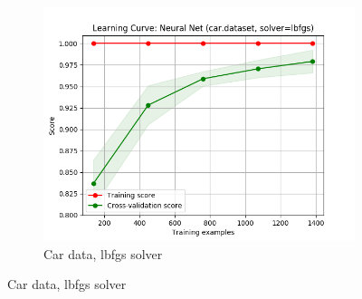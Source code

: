 \documentclass{article}
\begin{document}
\begin{figure}[htb]
\begin{subfigure}{0.33\textwidth}
      \includegraphics[width=\linewidth]{out/neural_net/car-solver-lbfgs.png}
      \caption{Car data, lbfgs solver}
      \label{fig:nn-param-3}
    \end{subfigure}

    \medskip


\end{figure}
\end{document}
